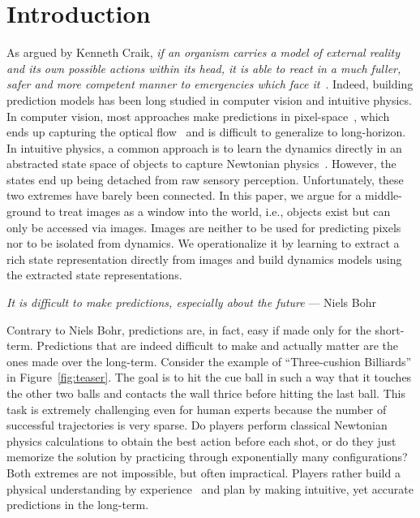 \documentclass{article} \usepackage{iclr2021_conference,times}
\begin{document}
\section{Introduction}
\vspace{-0.5em}
As argued by Kenneth Craik, \textit{if an organism carries a model of external reality and its own possible actions within its head, it is able to react in a much fuller, safer and more competent manner to emergencies which face it}~\citep{craik1952nature}. Indeed, building prediction models has been long studied in computer vision and intuitive physics. In computer vision, most approaches make predictions in pixel-space~\citep{denton2018stochastic,lee2018stochastic,ebert2018visual,jayaraman2018time,walker2016uncertain}, which ends up capturing the optical flow~\citep{walker2016uncertain} and is difficult to generalize to long-horizon. In intuitive physics, a common approach is to learn the dynamics directly in an abstracted state space of objects to capture Newtonian physics~\citep{battaglia2016interaction,chang2016compositional,sanchez2020learning}. However, the states end up being detached from raw sensory perception. Unfortunately, these two extremes have barely been connected. In this paper, we argue for a middle-ground to treat images as a window into the world, i.e., objects exist but can only be accessed via images. Images are neither to be used for predicting pixels nor to be isolated from dynamics. We operationalize it by learning to extract a rich state representation directly from images and build dynamics models using the extracted state representations. 

\hfill \textit{It is difficult to make predictions, especially about the future} --- Niels Bohr

Contrary to Niels Bohr, predictions are, in fact, easy if made only for the short-term. Predictions that are indeed difficult to make and actually matter are the ones made over the long-term. Consider the example of ``Three-cushion Billiards'' in Figure~\ref{fig:teaser}. The goal is to hit the cue ball in such a way that it touches the other two balls and contacts the wall thrice before hitting the last ball. This task is extremely challenging even for human experts because the number of successful trajectories is very sparse. Do players perform classical Newtonian physics calculations to obtain the best action before each shot, or do they just memorize the solution by practicing through exponentially many configurations? Both extremes are not impossible, but often impractical. Players rather build a physical understanding by experience~\citep{mccloskey1983intuitive,kubricht2017intuitive} and plan by making intuitive, yet accurate predictions in the long-term.
\end{document}
